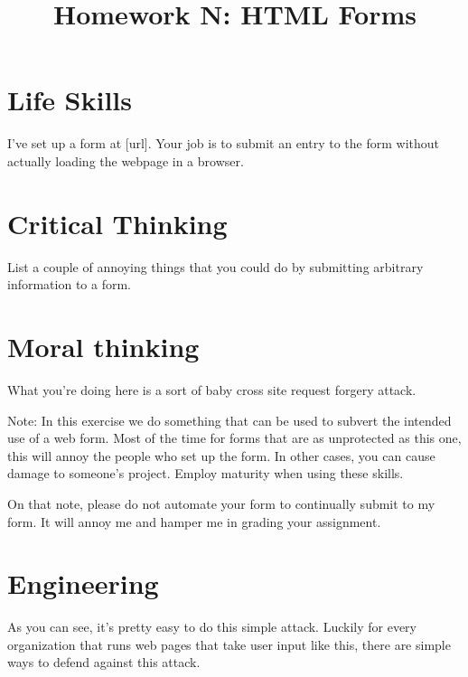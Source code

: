 \documentclass{article}
\title{Homework N:  HTML Forms}
\begin{document}
\maketitle


\section{Life Skills}

I've set up a form at [url].  Your job is to submit an entry to the form without actually loading the webpage in a browser.

\section{Critical Thinking}

List a couple of annoying things that you could do by submitting arbitrary information to a form.

\section{Moral thinking}
What you're doing here is a sort of baby cross site request forgery attack.  

Note:  In this exercise we do something that can be used to subvert the intended use of a web form.  Most of the time for forms that are as unprotected as this one, this will annoy the people who set up the form.  In other cases, you can cause damage to someone's project.  Employ maturity when using these skills.

On that note, please do not automate your form to continually submit to my form.  It will annoy me and hamper me in grading your assignment.

\section{Engineering}
As you can see, it's pretty easy to do this simple attack.  Luckily for every organization that runs web pages that take user input like this, there are simple ways to defend against this attack.




\end{document}
